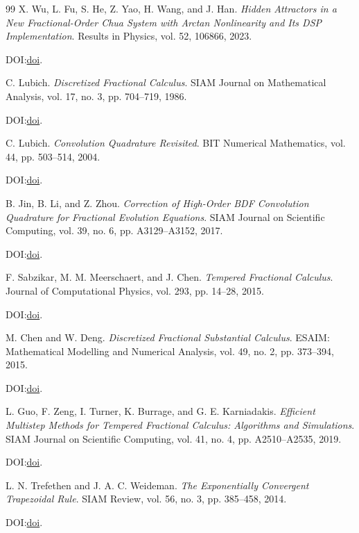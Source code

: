 \documentclass[11pt]{article}
\begin{document}
\begin{thebibliography}{99}
X. Wu, L. Fu, S. He, Z. Yao, H. Wang, and J. Han.
\emph{Hidden Attractors in a New Fractional-Order Chua System with Arctan Nonlinearity and Its DSP Implementation}.
Results in Physics, vol. 52, 106866, 2023.
\par\noindent DOI:\@ \href{https://doi.org/10.1016/j.rinp.2023.106866}{doi}.

C. Lubich.
\emph{Discretized Fractional Calculus}.
SIAM Journal on Mathematical Analysis, vol. 17, no. 3, pp. 704--719, 1986.
\par\noindent DOI:\@ \href{https://doi.org/10.1137/0517050}{doi}.

C. Lubich.
\emph{Convolution Quadrature Revisited}.
BIT Numerical Mathematics, vol. 44, pp. 503--514, 2004.
\par\noindent DOI:\@ \href{https://doi.org/10.1023/B:BITN.0000046813.23911.2D}{doi}.

B. Jin, B. Li, and Z. Zhou.
\emph{Correction of High-Order BDF Convolution Quadrature for Fractional Evolution Equations}.
SIAM Journal on Scientific Computing, vol. 39, no. 6, pp. A3129--A3152, 2017.
\par\noindent DOI:\@ \href{https://doi.org/10.1137/17M1118816}{doi}.

F. Sabzikar, M. M. Meerschaert, and J. Chen.
\emph{Tempered Fractional Calculus}.
Journal of Computational Physics, vol. 293, pp. 14--28, 2015.
\par\noindent DOI:\@ \href{https://doi.org/10.1016/j.jcp.2014.04.024}{doi}.

M. Chen and W. Deng.
\emph{Discretized Fractional Substantial Calculus}.
ESAIM: Mathematical Modelling and Numerical Analysis, vol. 49, no. 2,
pp. 373--394, 2015.
\par\noindent DOI:\@ \href{https://doi.org/10.1051/m2an/2014037}{doi}.

L. Guo, F. Zeng, I. Turner, K. Burrage, and G. E. Karniadakis.
\emph{Efficient Multistep Methods for Tempered Fractional Calculus:
Algorithms and Simulations}.
SIAM Journal on Scientific Computing, vol. 41, no. 4,
pp. A2510--A2535, 2019.
\par\noindent DOI:\@ \href{https://doi.org/10.1137/18M1230153}{doi}.

L. N. Trefethen and J. A. C. Weideman.
\emph{The Exponentially Convergent Trapezoidal Rule}.
SIAM Review, vol. 56, no. 3, pp. 385--458, 2014.
\par\noindent DOI:\@ \href{https://doi.org/10.1137/130932132}{doi}.


\end{thebibliography}
\end{document}
